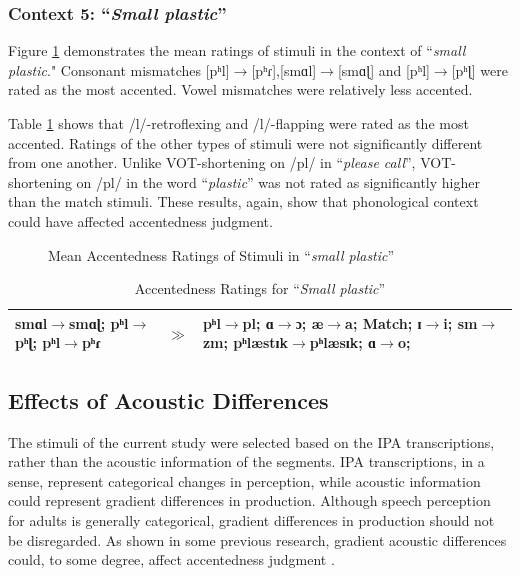 \subsubsection{Context 5: “\textit{Small plastic}”}

Figure \ref{fig:smp2} demonstrates the mean ratings of stimuli in the context of ``\textit{small plastic}." Consonant mismatches [pʰl]$\rightarrow$[pʰɾ],[smɑl]$\rightarrow$[smɑɭ] and [pʰl]$\rightarrow$[pʰɭ] were rated as the most accented. Vowel mismatches were relatively less accented. 

Table \ref{table:smp2} shows that /l/-retroflexing and /l/-flapping were rated as the most accented. Ratings of the other types of stimuli were not significantly different from one another. Unlike VOT-shortening on /pl/ in “\textit{please call}”, VOT-shortening on /pl/ in the word “\textit{plastic}” was not rated as significantly higher than the match stimuli. These results, again, show that phonological context could have affected accentedness judgment.

\begin{figure}[p]
  \figSpace
\centering

\caption{Mean Accentedness Ratings of Stimuli in “\textit{small plastic}”}
\label{fig:smp2}
\figSpace
\end{figure}

\begin{table}[p]
  \figSpace
  \centering
  \caption{Accentedness Ratings for “\textit{Small plastic}” }
  \label{table:smp2}%
    \begin{tabular}{lcp{40mm}}
    \toprule
  smɑl$\rightarrow$smɑɭ; pʰl$\rightarrow$pʰɭ; pʰl$\rightarrow$pʰɾ& $\gg$ &pʰl$\rightarrow$pl; ɑ$\rightarrow$ɔ; æ$\rightarrow$a; 
  Match; ɪ$\rightarrow$i; sm$\rightarrow$zm; pʰlæstɪk$\rightarrow$pʰlæsɪk; ɑ$\rightarrow$o; \\
    \bottomrule
    \end{tabular}%
      \figSpace
\end{table}%

\subsection{Effects of Acoustic Differences}

The stimuli of the current study were selected based on the IPA transcriptions, rather than the acoustic information of the segments. IPA transcriptions, in a sense, represent categorical changes in perception, while acoustic information could represent gradient differences in production. Although speech perception for adults is generally categorical, gradient differences in production should not be disregarded. As shown in some previous research, gradient acoustic differences could, to some degree, affect accentedness judgment \citep{McCullough_2013}. 

